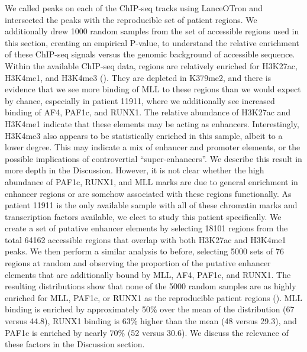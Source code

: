 We called peaks on each of the ChIP-seq tracks using LanceOTron and intersected the peaks with the reproducible set of patient regions. We additionally drew 1000 random samples from the set of accessible regions used in this section, creating an empirical P-value, to understand the relative enrichment of these ChIP-seq signals versus the genomic background of accessible sequence. Within the available ChIP-seq data, regions are relatively enriched for H3K27ac, H3K4me1, and H3K4me3 (). They are depleted in K379me2, and there is evidence that we see more binding of MLL to these regions than we would expect by chance, especially in patient 11911, where we additionally see increased binding of AF4, PAF1c, and RUNX1. The relative abundance of H3K27ac and H3K4me1 indicate that these elements may be acting as enhancers. Interestingly, H3K4me3 also appears to be statistically enriched in this sample, albeit to a lower degree. This may indicate a mix of enhancer and promoter elements, or the possible implications of controvertial ``super-enhancers''. We describe this result in more depth in the Discussion.  However, it is not clear whether the high abundance of PAF1c, RUNX1, and MLL marks are due to general enrichment in enhancer regions or are somehow associated with these regions functionally. As patient 11911 is the only available sample with all of these chromatin marks and transcription factors available, we elect to study this patient specifically. We create a set of putative enhancer elements by selecting 18101 regions from the total 64162 accessible regions that overlap with both H3K27ac and H3K4me1 peaks. We then perform a similar analysis to before, selecting 5000 sets of 76 regions at random and observing the proportion of the putative enhancer elements that are additionally bound by MLL, AF4, PAF1c, and RUNX1. The resulting distributions show that none of the 5000 random samples are as highly enriched for MLL, PAF1c, or RUNX1 as the reproducible patient regions (). MLL binding is enriched by approximately 50\% over the mean of the distribution (67 versus 44.8), RUNX1 binding is 63\% higher than the mean (48 versus 29.3), and PAF1c is enriched by nearly 70\% (52 versus 30.6). We discuss the relevance of these factors in the Discussion section. 

